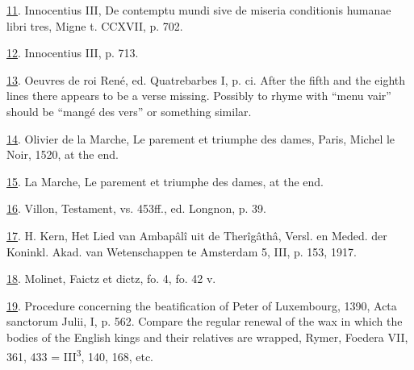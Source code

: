 \protect\hypertarget{23_NOTES.xhtmlux5cux23id_1330}{\protect\hyperlink{12_Chapter_Five__THE_VISION_OF_DEAT.xhtmlux5cux23id_1329}{11}}.
Innocentius III, De contemptu mundi sive de miseria conditionis humanae
libri tres, Migne t. CCXVII, p. 702.

\protect\hypertarget{23_NOTES.xhtmlux5cux23id_1328}{\protect\hyperlink{12_Chapter_Five__THE_VISION_OF_DEAT.xhtmlux5cux23id_1327}{12}}.
Innocentius III, p. 713.

\protect\hypertarget{23_NOTES.xhtmlux5cux23page_415}{\protect\hyperlink{12_Chapter_Five__THE_VISION_OF_DEAT.xhtmlux5cux23id_1326}{13}}.
Oeuvres de roi René, ed. Quatrebarbes I, p. ci. After the fifth and the
eighth lines there appears to be a verse missing. Possibly to rhyme with
``menu vair'' should be ``mangé des vers'' or something similar.

\protect\hypertarget{23_NOTES.xhtmlux5cux23id_1325}{\protect\hyperlink{12_Chapter_Five__THE_VISION_OF_DEAT.xhtmlux5cux23id_1324}{14}}.
Olivier de la Marche, Le parement et triumphe des dames, Paris, Michel
le Noir, 1520, at the end.

\protect\hypertarget{23_NOTES.xhtmlux5cux23id_1323}{\protect\hyperlink{12_Chapter_Five__THE_VISION_OF_DEAT.xhtmlux5cux23id_1322}{15}}.
La Marche, Le parement et triumphe des dames, at the end.

\protect\hypertarget{23_NOTES.xhtmlux5cux23id_1321}{\protect\hyperlink{12_Chapter_Five__THE_VISION_OF_DEAT.xhtmlux5cux23id_1320}{16}}.
Villon, Testament, vs. 453ff., ed. Longnon, p. 39.

\protect\hypertarget{23_NOTES.xhtmlux5cux23id_1319}{\protect\hyperlink{12_Chapter_Five__THE_VISION_OF_DEAT.xhtmlux5cux23id_1318}{17}}.
H. Kern, Het Lied van Ambapâlî uit de Therîgâthâ, Versl. en Meded. der
Koninkl. Akad. van Wetenschappen te Amsterdam 5, III, p. 153, 1917.

\protect\hypertarget{23_NOTES.xhtmlux5cux23id_1317}{\protect\hyperlink{12_Chapter_Five__THE_VISION_OF_DEAT.xhtmlux5cux23id_1316}{18}}.
Molinet, Faictz et dictz, fo. 4, fo. 42 v.

\protect\hypertarget{23_NOTES.xhtmlux5cux23id_1315}{\protect\hyperlink{12_Chapter_Five__THE_VISION_OF_DEAT.xhtmlux5cux23id_1314}{19}}.
Procedure concerning the beatification of Peter of Luxembourg, 1390,
Acta sanctorum Julii, I, p. 562. Compare the regular renewal of the wax
in which the bodies of the English kings and their relatives are
wrapped, Rymer, Foedera VII, 361, 433 = III\textsuperscript{3}, 140,
168, etc.

